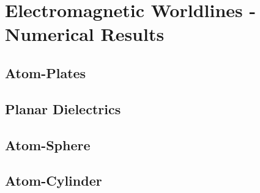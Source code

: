 \chapter{Electromagnetic Worldlines - Numerical Results}
    \section{ Atom-Plates}
    \section{Planar Dielectrics}
    \section{Atom-Sphere}
    \section{Atom-Cylinder}


